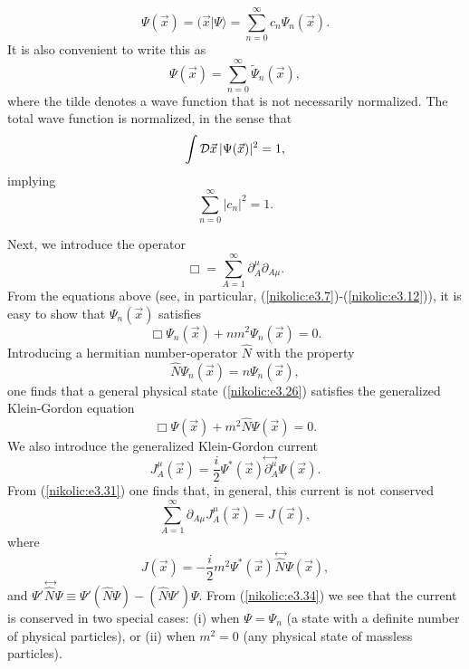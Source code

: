 \documentclass[12pt,twoside]{report} %
\begin{document}
\begin{equation}\label{nikolic:e3.26}
 \Psi(\vec{x})=(\vec{x}|\Psi\rangle = 
\sum_{n=0}^{\infty}c_n \Psi_n(\vec{x}) .
\end{equation}
It is also convenient to write this as
\begin{equation}\label{nikolic:e3.27}
\Psi(\vec{x})=\sum_{n=0}^{\infty} \tilde{\Psi}_n(\vec{x}) ,
\end{equation}
where the tilde denotes a wave function that is not necessarily normalized.
The total wave function is normalized, in the sense that
\begin{equation}\label{nikolic:e3.26.1}
 \int {\cal D}\vec{x} \, |\Psi(\vec{x})|^2=1 ,
\end{equation}
implying
\begin{equation}\label{nikolic:e3.26.2}
 \sum_{n=0}^{\infty}|c_n|^2=1 .
\end{equation}



Next, we introduce the operator
\begin{equation}\label{nikolic:e3.28}
 \Box = \sum_{A=1}^{\infty} \partial_A^{\mu} \partial_{A\mu} .
\end{equation}
From the equations above (see, in particular, (\ref{nikolic:e3.7})-(\ref{nikolic:e3.12})), 
it is easy to show that $\Psi_n(\vec{x})$ satisfies
\begin{equation}\label{nikolic:e3.29}
 \Box\Psi_n(\vec{x}) +nm^2 \Psi_n(\vec{x}) =0 .
\end{equation}
Introducing a hermitian number-operator $\hat{N}$ with the property
\begin{equation}\label{nikolic:e3.30}
 \hat{N}\Psi_n(\vec{x}) = n \Psi_n(\vec{x}) ,
\end{equation}
one finds that a general physical state (\ref{nikolic:e3.26}) satisfies the generalized
Klein-Gordon equation
\begin{equation}\label{nikolic:e3.31}
 \Box\Psi(\vec{x})+m^2\hat{N}\Psi(\vec{x})=0.
\end{equation}
We also introduce the generalized Klein-Gordon current
\begin{equation}\label{nikolic:e3.32}
 J^{\mu}_A(\vec{x})=
\frac{i}{2} \Psi^*(\vec{x})\!\stackrel{\leftrightarrow\;}{\partial^{\mu}_A}\! \Psi (\vec{x}) .
\end{equation}
From (\ref{nikolic:e3.31}) one finds that, in general, this current is not conserved
\begin{equation}\label{nikolic:e3.33}
 \sum_{A=1}^{\infty}\partial_{A\mu}J^{\mu}_A(\vec{x}) = J(\vec{x}) ,
\end{equation}
where
\begin{equation}\label{nikolic:e3.34}
 J(\vec{x})=-\frac{i}{2}m^2 
\Psi^*(\vec{x})\!\stackrel{\;\leftrightarrow}{\hat{N}}\! \Psi (\vec{x}) ,
\end{equation}
and $\Psi' \!\stackrel{\;\leftrightarrow}{\hat{N}}\! \Psi \equiv 
\Psi' (\hat{N}\Psi) - ( \hat{N} \Psi') \Psi$. 
From (\ref{nikolic:e3.34}) we see that the current is conserved in two special cases:
(i) when $\Psi=\Psi_n$ (a state with a definite number of physical
particles), or (ii) when $m^2=0$ (any physical state of massless particles). 
\end{document}
